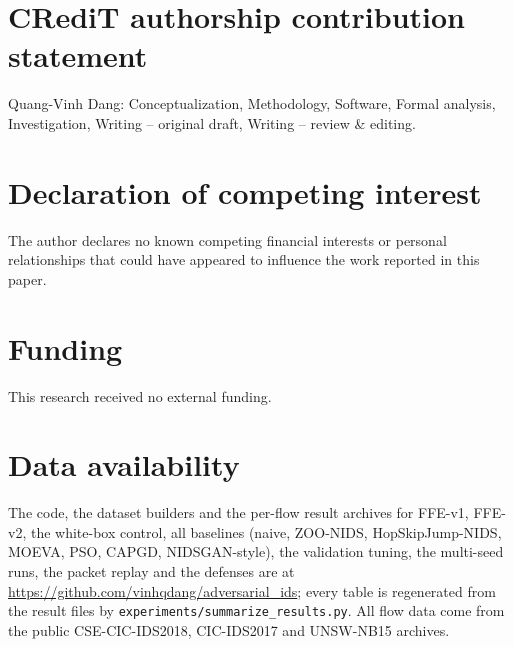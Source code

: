 \documentclass[review,12pt]{elsarticle}
\theoremstyle{plain}
\theoremstyle{definition}
\theoremstyle{remark}
\begin{document}













{\def\baselinestretch{1}\small\selectfont
\section*{CRediT authorship contribution statement}
Quang-Vinh Dang: Conceptualization, Methodology, Software, Formal analysis, Investigation, Writing -- original draft, Writing -- review \& editing.

\section*{Declaration of competing interest}
The author declares no known competing financial interests or personal relationships that could have appeared to influence the work reported in this paper.

\section*{Funding}
This research received no external funding.

\section*{Data availability}
\sloppy
The code, the dataset builders and the per-flow result archives for FFE-v1, FFE-v2, the white-box control, all baselines (naive, ZOO-NIDS, HopSkipJump-NIDS, MOEVA, PSO, CAPGD, NIDSGAN-style), the validation tuning, the multi-seed runs, the packet replay and the defenses are at \url{https://github.com/vinhqdang/adversarial_ids}; every table is regenerated from the result files by \texttt{experiments/summarize\_results.py}. All flow data come from the public CSE-CIC-IDS2018, CIC-IDS2017 and UNSW-NB15 archives.



}
{\def\baselinestretch{1}\footnotesize\selectfont\sloppy
\setlength{\bibsep}{0.5pt plus 0.5pt minus 0.2pt}

}
\end{document}
